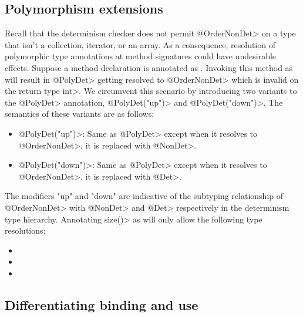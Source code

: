 \subsection{Polymorphism extensions}

Recall that the determinism checker does not permit \<@OrderNonDet> on a type that isn't a collection, iterator, or an array.
As a consequence, resolution of polymorphic type annotations at method signatures could have undesirable effects.
Suppose a method declaration is annotated as . Invoking this method
as  will result in \<@PolyDet> getting resolved to \<@OrderNonDet> which is invalid
on the return type \<int>. We circumvent this scenario by introducing two variants to the \<@PolyDet> annotation, \<@PolyDet("up")>
and \<@PolyDet("down")>. The semantics of these variants are as follows:
\begin{itemize}
    \item \<@PolyDet("up")>: Same as \<@PolyDet> except when it resolves to \<@OrderNonDet>, it is replaced with \<@NonDet>.
    \item \<@PolyDet("down")>: Same as \<@PolyDet> except when it resolves to \<@OrderNonDet>, it is replaced with \<@Det>.
\end{itemize} 
The modifiers "up" and "down" are indicative of the subtyping relationship of \<@OrderNonDet> with \<@NonDet> and \<@Det> respectively
in the determinism type hierarchy.
Annotating \<size()> as  will only allow the following type resolutions:
\begin{itemize}
    \item {}
    \item {}
    \item {}
\end{itemize}

\subsection{Differentiating binding and use}

